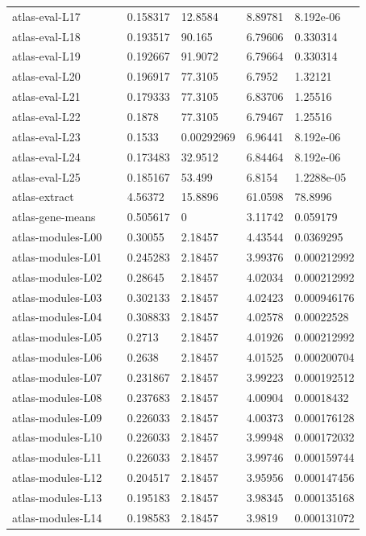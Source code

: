 \begin{longtable}{@{}L{0.39\linewidth}L{0.11\linewidth}L{0.12\linewidth}L{0.12\linewidth}L{0.13\linewidth}@{}}
atlas-eval-L17 & 0.158317 & 12.8584 & 8.89781 & \mbox{8.192e-06} \\
atlas-eval-L18 & 0.193517 & 90.165 & 6.79606 & 0.330314 \\
atlas-eval-L19 & 0.192667 & 91.9072 & 6.79664 & 0.330314 \\
atlas-eval-L20 & 0.196917 & 77.3105 & 6.7952 & 1.32121 \\
atlas-eval-L21 & 0.179333 & 77.3105 & 6.83706 & 1.25516 \\
atlas-eval-L22 & 0.1878 & 77.3105 & 6.79467 & 1.25516 \\
atlas-eval-L23 & 0.1533 & 0.00292969 & 6.96441 & \mbox{8.192e-06} \\
atlas-eval-L24 & 0.173483 & 32.9512 & 6.84464 & \mbox{8.192e-06} \\
atlas-eval-L25 & 0.185167 & 53.499 & 6.8154 & \mbox{1.2288e-05} \\
atlas-extract & 4.56372 & 15.8896 & 61.0598 & 78.8996 \\
atlas-gene-means & 0.505617 & 0 & 3.11742 & 0.059179 \\
atlas-modules-L00 & 0.30055 & 2.18457 & 4.43544 & 0.0369295 \\
atlas-modules-L01 & 0.245283 & 2.18457 & 3.99376 & 0.000212992 \\
atlas-modules-L02 & 0.28645 & 2.18457 & 4.02034 & 0.000212992 \\
atlas-modules-L03 & 0.302133 & 2.18457 & 4.02423 & 0.000946176 \\
atlas-modules-L04 & 0.308833 & 2.18457 & 4.02578 & 0.00022528 \\
atlas-modules-L05 & 0.2713 & 2.18457 & 4.01926 & 0.000212992 \\
atlas-modules-L06 & 0.2638 & 2.18457 & 4.01525 & 0.000200704 \\
atlas-modules-L07 & 0.231867 & 2.18457 & 3.99223 & 0.000192512 \\
atlas-modules-L08 & 0.237683 & 2.18457 & 4.00904 & 0.00018432 \\
atlas-modules-L09 & 0.226033 & 2.18457 & 4.00373 & 0.000176128 \\
atlas-modules-L10 & 0.226033 & 2.18457 & 3.99948 & 0.000172032 \\
atlas-modules-L11 & 0.226033 & 2.18457 & 3.99746 & 0.000159744 \\
atlas-modules-L12 & 0.204517 & 2.18457 & 3.95956 & 0.000147456 \\
atlas-modules-L13 & 0.195183 & 2.18457 & 3.98345 & 0.000135168 \\
atlas-modules-L14 & 0.198583 & 2.18457 & 3.9819 & 0.000131072 \\

\end{longtable}
